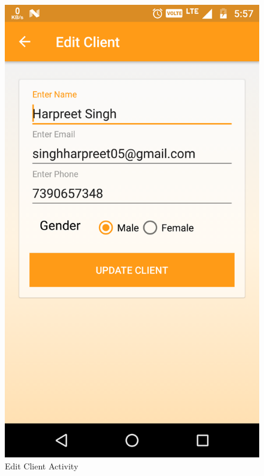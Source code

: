 \\
\begin{figure}[h]
	\centering
	\includegraphics[width=0.7\linewidth]{EditClient}
	\caption{Edit Client Activity}
\end{figure}
\pagebreak

